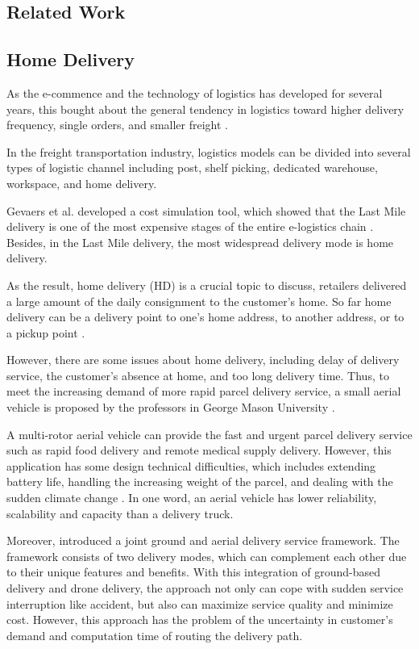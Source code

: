 \documentclass[12pt]{ksthesis}
\begin{document}
\begin{thesis}
{  


\chapter{Related Work} \label{Chap:Related}

\section{Home Delivery}
As the e-commence and the technology of logistics has developed for several years, this bought about the general tendency in logistics toward higher delivery frequency, single orders, and smaller freight \cite{Visser2014}.


In the freight transportation industry, logistics models can be divided into several types of logistic channel including post, shelf picking, dedicated warehouse, workspace, and home delivery.

Gevaers et al. developed a cost simulation tool, which showed that the Last Mile delivery is one of the most expensive stages of the entire e-logistics chain \cite{Gevaers2014}. Besides, in the Last Mile delivery, the most widespread delivery mode is home delivery.

As the result, home delivery (HD) is a crucial topic to discuss, retailers delivered a large amount of the daily consignment to the customer’s home. So far home delivery can be a delivery point to one’s home address, to another address, or to a pickup point  \cite{Zhou2016}. 

However, there are some issues about home delivery, including delay of delivery service, the customer’s absence at home, and too long delivery time. Thus, to meet the increasing demand of more rapid parcel delivery service, a small aerial vehicle is proposed by the professors in George Mason University \cite{Ali2015}.

A multi-rotor aerial vehicle can provide the fast and urgent parcel delivery service such as rapid food delivery and remote medical supply delivery. However, this application has some design technical difficulties, which includes extending battery life, handling the increasing weight of the parcel, and dealing with the sudden climate change \cite{Ali2015}. In one word, an aerial vehicle has lower reliability, scalability and capacity than a delivery truck.

Moreover, \cite{Sawadsitang2018} introduced a joint ground and aerial delivery service framework. The framework consists of two delivery modes, which can complement each other due to their unique features and benefits. With this integration of ground-based delivery and drone delivery, the approach not only can cope with sudden service interruption like accident, but also can maximize service quality and minimize cost. However, this approach has the problem of the uncertainty in customer’s demand and computation time of routing the delivery path. 

}
\end{thesis}
\end{document}
